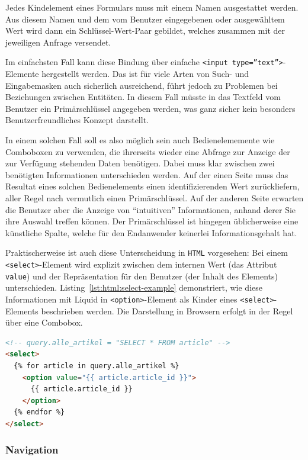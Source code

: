 Jedes Kindelement eines Formulars muss mit einem Namen ausgestattet werden. Aus diesem Namen und dem vom Benutzer eingegebenen oder ausgewähltem Wert wird dann ein Schlüssel-Wert-Paar gebildet, welches zusammen mit der jeweiligen Anfrage versendet.

Im einfachsten Fall kann diese Bindung über einfache \texttt{<input type=''text''>}-Elemente hergestellt werden. Das ist für viele Arten von Such- und Eingabemasken auch sicherlich ausreichend, führt jedoch zu Problemen bei Beziehungen zwischen Entitäten. In diesem Fall müsste in das Textfeld vom Benutzer ein Primärschlüssel angegeben werden, was ganz sicher kein besonders Benutzerfreundliches Konzept darstellt.

In einem solchen Fall soll es also möglich sein auch Bedienelememente wie Comboboxen zu verwenden, die ihrerseits wieder eine Abfrage zur Anzeige der zur Verfügung stehenden Daten benötigen. Dabei muss klar zwischen zwei benötigten Informationen unterschieden werden. Auf der einen Seite muss das Resultat eines solchen Bedienelements einen identifizierenden Wert zurückliefern, aller Regel nach vermutlich einen Primärschlüssel. Auf der anderen Seite erwarten die Benutzer aber die Anzeige von \enquote{intuitiven} Informationen, anhand derer Sie ihre Auswahl treffen können. Der Primärschlüssel ist hingegen üblicherweise eine künstliche Spalte, welche für den Endanwender keinerlei Informationsgehalt hat.

Praktischerweise ist auch diese Unterscheidung in \texttt{HTML} vorgesehen: Bei einem \texttt{<select>}-Element wird explizit zwischen dem internen Wert (das Attribut \texttt{value}) und der Repräsentation für den Benutzer (der Inhalt des Elements) unterschieden. Listing~\ref{lst:html:select-example} demonstriert, wie diese Informationen mit Liquid in \texttt{<option>}-Element als Kinder eines \texttt{<select>}-Elements beschrieben werden. Die Darstellung in Browsern erfolgt in der Regel über eine Combobox.

\begin{lstlisting}[float,language=HTML, caption=Containerelemente mit Kindern, label=lst:html:select-example]
<!-- query.alle_artikel = "SELECT * FROM article" -->
<select>
  {% for article in query.alle_artikel %}
    <option value="{{ article.article_id }}">
      {{ article.article_id }}
    </option>
  {% endfor %}
</select>
\end{lstlisting}

\subsubsection{Navigation}
\label{sec:concept-navigation}

